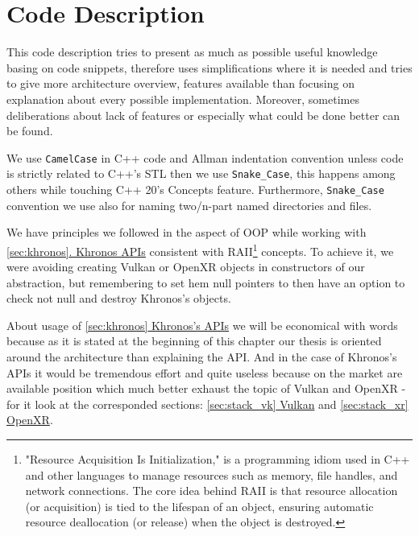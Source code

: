 \newpage
\section{Code Description}
\label{sec:code_descr}
This code description tries to present as much as possible useful knowledge basing on code snippets, therefore uses simplifications where it is needed and tries to give more architecture overview, features available than focusing on explanation about every possible implementation. Moreover, sometimes deliberations about lack of features or especially what could be done better can be found.

We use \texttt{CamelCase} in C++ code and Allman indentation convention unless code is strictly related to C++'s STL then we use \texttt{Snake\_Case}, this happens among others while touching C++ 20's Concepts feature.
Furthermore, \texttt{Snake\_Case} convention we use also for naming two/n-part named directories and files.

We have principles we followed in the aspect of OOP while working with \hyperref[sec:khronos]{\ref*{sec:khronos}. Khronos APIs} consistent with RAII\footnote{"Resource Acquisition Is Initialization," is a programming idiom used in C++ and other languages to manage resources such as memory, file handles, and network connections. The core idea behind RAII is that resource allocation (or acquisition) is tied to the lifespan of an object, ensuring automatic resource deallocation (or release) when the object is destroyed.} concepts. To achieve it, we were avoiding creating Vulkan or OpenXR objects in constructors of our abstraction, but remembering to set hem null pointers to then have an option to check not null and destroy Khronos's objects.

About usage of \hyperref[sec:khronos]{\ref*{sec:khronos} Khronos's APIs} we will be economical with words because as it is stated at the beginning of this chapter our thesis is oriented around the architecture than explaining the API. And in the case of Khronos's APIs it would be tremendous effort and quite useless because on the market are available position which much better exhaust the topic of Vulkan and OpenXR - for it look at the corresponded sections: \hyperref[sec:stack_vk]{\ref*{sec:stack_vk} Vulkan} and \hyperref[sec:stack_xr]{\ref*{sec:stack_xr} OpenXR}.

